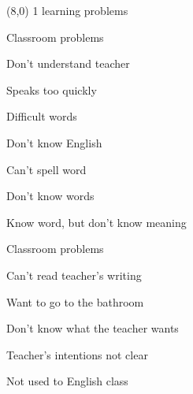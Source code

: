 \documentclass[b5paper]{article}
\newcommand{\mycard}[5]{%
	\small #1 #2
	\par
	\parbox{7.5cm}{%
	\Large#3\\
	\normalsize#4 #5
	}
}
\begin{document}
\begin{textblock}{8}(8,0)
\mycard{1}{learning problems}{Classroom problems}{
\begin{description}
	\item Don't understand teacher 
	\begin{description}
		\item Speaks too quickly
		\item Difficult words
	\end{description}
	\item Don't know English
	\begin{description}
		\item Can't spell word
		\item Don't know words
		\item Know word, but don't know meaning
	\end{description}
	\item Classroom problems
	\begin{description}
		\item Can't read teacher's writing
		\item Want to go to the bathroom
	\end{description}
	\item Don't know what the teacher wants
	\begin{description}
		\item Teacher's intentions not clear
		\item Not used to English class
	\end{description}
\end{description}
}{}
\end{textblock}
\end{document}
